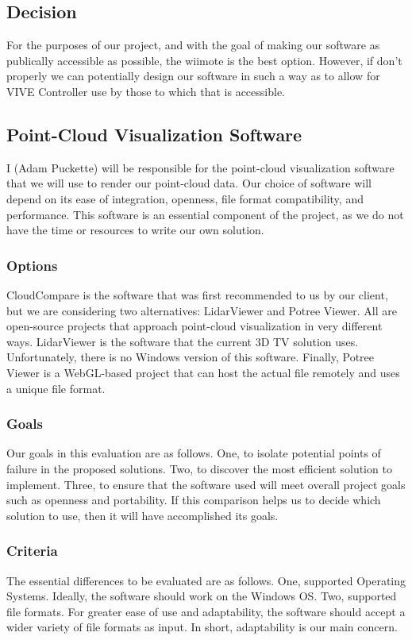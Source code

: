\subsection{Decision}
For the purposes of our project, and with the goal of making our software as publically accessible as possible, the wiimote is the best option.
However, if don't properly we can potentially design our software in such a way as to allow for VIVE Controller use by those to which that is accessible. 

\subsection{Point-Cloud Visualization Software}
I (Adam Puckette) will be responsible for the point-cloud visualization software that we will use to render our point-cloud data. 
Our choice of software will depend on its ease of integration, openness, file format compatibility, and performance. 
This software is an essential component of the project, as we do not have the time or resources to write our own solution. 

\subsubsection{Options}
CloudCompare is the software that was first recommended to us by our client, but we are considering two alternatives: LidarViewer and Potree Viewer. 
All are open-source projects that approach point-cloud visualization in very different ways. 
LidarViewer is the software that the current 3D TV solution uses. 
Unfortunately, there is no Windows version of this software. 
Finally, Potree Viewer is a WebGL-based project that can host the actual file remotely and uses a unique file format.

\subsubsection{Goals}
Our goals in this evaluation are as follows. 
One, to isolate potential points of failure in the proposed solutions. 
Two, to discover the most efficient solution to implement. 
Three, to ensure that the software used will meet overall project goals such as openness and portability. 
If this comparison helps us to decide which solution to use, then it will have accomplished its goals.

\subsubsection{Criteria}
The essential differences to be evaluated are as follows. 
One, supported Operating Systems. Ideally, the software should work on the Windows OS.
Two, supported file formats. For greater ease of use and adaptability, the software should accept a wider variety of file formats as input. In short, adaptability is our main concern.

